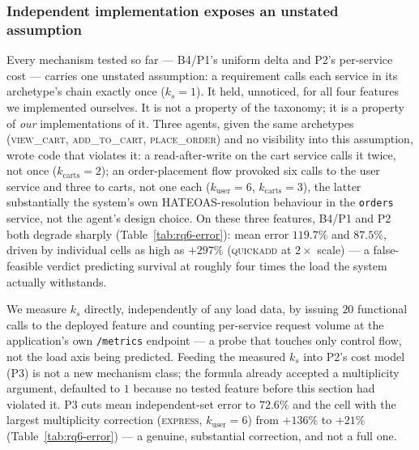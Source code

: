 \documentclass[journal, 10pt]{IEEEtran}
\begin{document}
\subsubsection{Independent implementation exposes an unstated assumption}
\label{sec:rq6-independent}
Every mechanism tested so far --- B4/P1's uniform delta and P2's per-service
cost --- carries one unstated assumption: a requirement calls each service in
its archetype's chain exactly once ($k_s=1$). It held, unnoticed, for all four
features we implemented ourselves. It is not a property of the taxonomy; it is
a property of \emph{our} implementations of it. Three agents, given the same
archetypes (\textsc{view\_cart}, \textsc{add\_to\_cart}, \textsc{place\_order})
and no visibility into this assumption, wrote code that violates it: a
read-after-write on the cart service calls it twice, not once
($k_{\text{carts}}=2$); an order-placement flow provoked six calls to the user
service and three to carts, not one each ($k_{\text{user}}=6$,
$k_{\text{carts}}=3$), the latter substantially the system's own
HATEOAS-resolution behaviour in the \texttt{orders} service, not the agent's
design choice. On these three features, B4/P1 and P2 both degrade sharply
(Table~\ref{tab:rq6-error}): mean error $119.7\%$ and $87.5\%$, driven by
individual cells as high as $+297\%$ (\textsc{quickadd} at $2\times$ scale) ---
a false-feasible verdict predicting survival at roughly four times the load
the system actually withstands.

We measure $k_s$ directly, independently of any load data, by issuing $20$
functional calls to the deployed feature and counting per-service request
volume at the application's own \texttt{/metrics} endpoint --- a probe that
touches only control flow, not the load axis being predicted. Feeding the
measured $k_s$ into P2's cost model (P3) is not a new mechanism class; the
formula already accepted a multiplicity argument, defaulted to $1$ because no
tested feature before this section had violated it. P3 cuts mean independent-set
error to $72.6\%$ and the cell with the largest multiplicity correction
(\textsc{express}, $k_{\text{user}}=6$) from $+136\%$ to $+21\%$
(Table~\ref{tab:rq6-error}) --- a genuine, substantial correction, and
not a full one.
\end{document}
